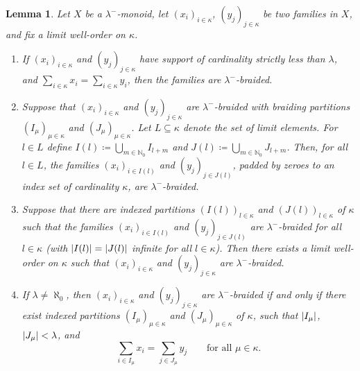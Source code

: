 \documentclass[a4paper,11pt,oneside]{amsart}
\newtheorem{lemma}[teor]{Lemma}
\theoremstyle{remark}
\DeclarePairedDelimiter{\card}{\lvert}{\rvert}
\newcommand{\bN}{\mathbb N}
\begin{document}
\begin{lemma} \label{l:braiding-collapse}
  Let $X$ be a $\lambda^-$-monoid, let $(x_i)_{i \in \kappa}$, $(y_j)_{j \in \kappa}$ be two families in $X$, and fix a limit well-order on $\kappa$.
  \begin{enumerate}
  \item \label{coll:trivial} If $(x_i)_{i \in \kappa}$ and $(y_j)_{j \in \kappa}$ have support of cardinality strictly less than $\lambda$, and $\sum_{i \in \kappa} x_i = \sum_{i \in \kappa} y_i$, then the families are $\lambda^-$-braided.
  \item \label{coll:layers} Suppose that $(x_i)_{i \in \kappa}$ and $(y_j)_{j \in \kappa}$ are $\lambda^-$-braided with braiding partitions $(I_\mu)_{\mu \in \kappa}$ and $(J_\mu)_{\mu \in \kappa}$.
    Let $L \subseteq \kappa$ denote the set of limit elements.
    For $l \in L$ define $I(l)\coloneqq \bigcup_{m \in \bN_0} I_{l+m}$ and $J(l)\coloneqq \bigcup_{m \in \bN_0} J_{l+m}$.
    Then, for all $l \in L$, the families $(x_{i})_{i \in I(l)}$ and $(y_j)_{j \in J(l)}$, padded by zeroes to an index set of cardinality $\kappa$, are $\lambda^-$-braided.
  \item \label{coll:layers-rev} Suppose that there are indexed partitions $(I(l))_{l \in \kappa}$ and $(J(l))_{l \in \kappa}$ of $\kappa$ such that the families $(x_i)_{i \in I(l)}$ and $(y_j)_{j \in J(l)}$ are $\lambda^-$-braided for all $l \in \kappa$
    \textup{(}with $\card{I(l)}=\card{J(l)}$ infinite for all $l \in \kappa$\textup).
     Then there exists a limit well-order on $\kappa$ such that $(x_i)_{i \in \kappa}$ and $(y_j)_{j \in \kappa}$ are $\lambda^-$-braided.

   \item \label{coll:uncountable} If $\lambda \ne \aleph_0$, then $(x_i)_{i \in \kappa}$ and $(y_j)_{j \in \kappa}$ are $\lambda^-$-braided if and only if there exist indexed partitions $(I_\mu)_{\mu \in \kappa}$ and $(J_{\mu})_{\mu \in \kappa}$ of $\kappa$, such that $\card{I_\mu}$, $\card{J_\mu} < \lambda$, and
    \[
      \sum_{i \in I_\mu} x_i = \sum_{j \in J_\mu} y_j \qquad\text{for all $\mu \in \kappa$.}
    \]
  \end{enumerate}
\end{lemma}
\end{document}

